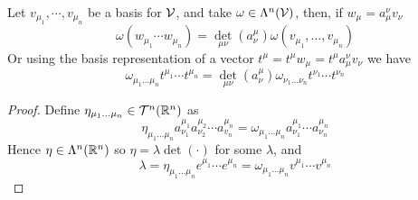 \documentclass[../complete.tex]{subfiles}
\begin{document}
\begin{thm}
	Let $v_{\mu_1},\cdots,v_{\mu_n}$ be a basis for $\mathcal{V}$, and take $\omega\in\Lambda^n(\mathcal{V})$, then, if $w_\mu=a_\mu^\nu v_\nu$
	\begin{equation}
		\omega(w_{\mu_1}\cdots w_{\mu_n})=\det_{\mu\nu}(a^\mu_\nu)\omega(v_{\mu_1},\ldots,v_{\mu_n})
		\label{eq:determinant1}
	\end{equation}
	Or using the basis representation of a vector $t^\mu=t^\mu w_\mu=t^\mu a_\mu^\nu v_\nu$ we have
	\begin{equation}
		\omega_{\mu_1\ldots\mu_n}t^{\mu_1}\cdots t^{\mu_n}=\det_{\mu\nu}(a^\mu_\nu)\omega_{\nu_1\ldots\nu_n}t^{\nu_1}\cdots t^{\nu_n}
		\label{eq:determinant2}
	\end{equation}
\end{thm}
\begin{proof}
	Define $\eta_{\mu_1\ldots\mu_n}\in\mathcal{T}^n(\mathbb{R}^n)$ as
	\begin{equation*}
	\eta_{\mu_1\ldots\mu_n}a^{\mu_1}_{\nu_1}a^{\mu_2}_{\nu_2}\cdots a^{\mu_n}_{v_n}=\omega_{\mu_1\ldots\mu_n}a^{\mu_1}_{\nu_1}\cdots a^{\mu_n}_{\nu_n}
	\end{equation*}
	Hence $\eta\in\Lambda^n(\mathbb{R}^n)$ so $\eta=\lambda\det(\cdot)$ for some $\lambda$, and
	\begin{equation*}
		\lambda=\eta_{\mu_1\ldots\mu_n}e^{\mu_1}\cdots e^{\mu_n}=\omega_{\mu_1\ldots\mu_n}v^{\mu_1}\cdots v^{\mu_n}
	\end{equation*}
\end{proof}
\end{document}
